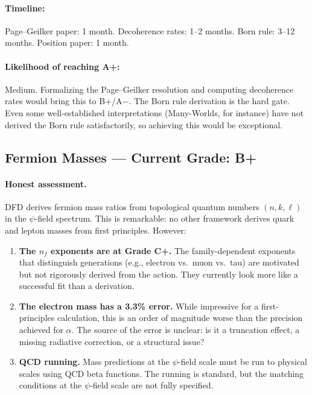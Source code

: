 \documentclass[11pt,a4paper]{article}
\begin{document}
\paragraph{Timeline:} Page--Geilker paper: 1 month. Decoherence rates: 1--2 months. Born rule: 3--12 months. Position paper: 1 month.

\paragraph{Likelihood of reaching A+:} \textcolor{gradeBplus}{Medium}. Formalizing the Page--Geilker resolution and computing decoherence rates would bring this to B+/A$-$. The Born rule derivation is the hard gate. Even some well-established interpretations (Many-Worlds, for instance) have not derived the Born rule satisfactorily, so achieving this would be exceptional.

\subsection{Fermion Masses --- Current Grade: B+}

\paragraph{Honest assessment.}
DFD derives fermion mass ratios from topological quantum numbers $(n, k, \ell)$ in the $\psi$-field spectrum. This is remarkable: no other framework derives quark and lepton masses from first principles. However:
\begin{enumerate}[label=(\alph*)]
    \item \textbf{The $n_f$ exponents are at Grade C+.} The family-dependent exponents that distinguish generations (e.g., electron vs.\ muon vs.\ tau) are motivated but not rigorously derived from the action. They currently look more like a successful fit than a derivation.
    \item \textbf{The electron mass has a 3.3\% error.} While impressive for a first-principles calculation, this is an order of magnitude worse than the precision achieved for $\alpha$. The source of the error is unclear: is it a truncation effect, a missing radiative correction, or a structural issue?
    \item \textbf{QCD running.} Mass predictions at the $\psi$-field scale must be run to physical scales using QCD beta functions. The running is standard, but the matching conditions at the $\psi$-field scale are not fully specified.
\end{enumerate}
\end{document}
